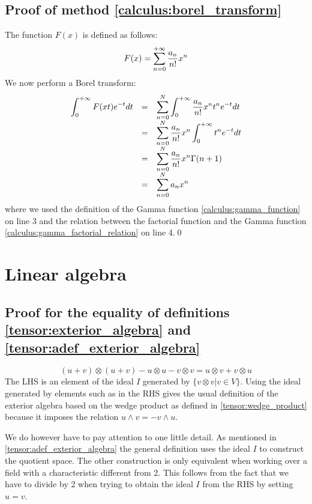 \subsection{Proof of method \ref{calculus:borel_transform}}
	The function $F(x)$ is defined as follows:
	\begin{equation}
		F(x) = \ds\sum_{n=0}^{+\infty}\stylefrac{a_n}{n!}x^n
	\end{equation}
	We now perform a Borel transform:
	\begin{equation}
    		\begin{array}{ccl}
    			\ds\int_0^{+\infty}F(xt)e^{-t}dt&=&\ds\sum_{n=0}^N\int_0^{+\infty}\stylefrac{a_n}{n!}x^nt^ne^{-t}dt\\
        		&=&\ds\sum_{n=0}^N\frac{a_n}{n!}x^n\int_0^{+\infty}t^ne^{-t}dt\\
		        &=&\ds\sum_{n=0}^N\frac{a_n}{n!}x^n\Gamma(n+1)\\
		        &=&\ds\sum_{n=0}^Na_nx^n
	    	\end{array}
       	\end{equation}
       	where we used the definition of the Gamma function \ref{calculus:gamma_function} on line 3 and the relation between the factorial function and the Gamma function \ref{calculus:gamma_factorial_relation} on line 4.\qed

\section{Linear algebra}
\subsection{Proof for the equality of definitions \ref{tensor:exterior_algebra} and \ref{tensor:adef_exterior_algebra}}
	\begin{equation}
		(u+v)\otimes(u+v) - u\otimes u - v\otimes v = u\otimes v + v\otimes u
	\end{equation}
	The LHS is an element of the ideal $I$ generated by $\{v\otimes v|v\in V\}$. Using the ideal generated by elements such as in the RHS gives the usual definition of the exterior algebra based on the wedge product as defined in \ref{tensor:wedge_product} because it imposes the relation $u\wedge v = -v\wedge u$.
	
	We do however have to pay attention to one little detail. As mentioned in \ref{tensor:adef_exterior_algebra} the general definition uses the ideal $I$ to construct the quotient space. The other construction is only equivalent when working over a field with a characteristic different from 2. This follows from the fact that we have to divide by 2 when trying to obtain the ideal $I$ from the RHS by setting $u=v$.

